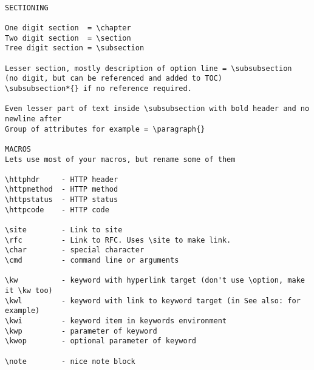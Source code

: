 \begin{verbatim}

SECTIONING

One digit section  = \chapter
Two digit section  = \section
Tree digit section = \subsection

Lesser section, mostly description of option line = \subsubsection
(no digit, but can be referenced and added to TOC)
\subsubsection*{} if no reference required.

Even lesser part of text inside \subsubsection with bold header and no newline after
Group of attributes for example = \paragraph{}

MACROS
Lets use most of your macros, but rename some of them

\httphdr     - HTTP header
\httpmethod  - HTTP method
\httpstatus  - HTTP status
\httpcode    - HTTP code

\site        - Link to site
\rfc         - Link to RFC. Uses \site to make link.
\char        - special character
\cmd         - command line or arguments

\kw          - keyword with hyperlink target (don't use \option, make it \kw too)
\kwl         - keyword with link to keyword target (in See also: for example)
\kwi         - keyword item in keywords environment
\kwp         - parameter of keyword
\kwop        - optional parameter of keyword

\note        - nice note block


\end{verbatim}
